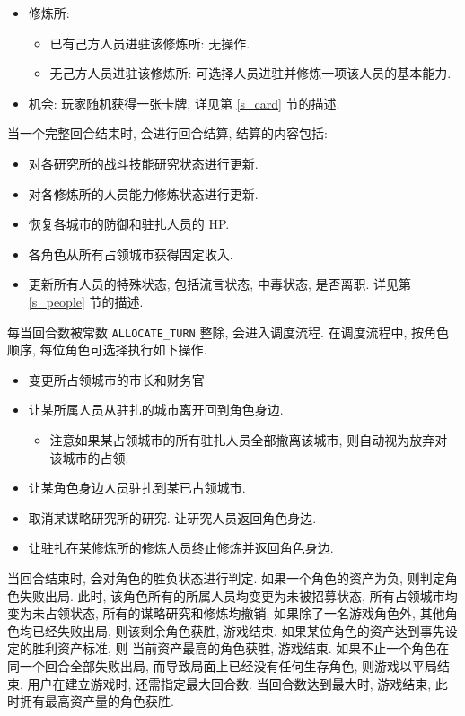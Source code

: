 \documentclass[UTF8, zihao=-4]{ctexart} %
\newcommand{\lcode}{\lstinline} % 段内插入代码
\begin{document}
\begin{itemize}
\begin{itemize}
\begin{itemize}
                \end{itemize}
            \item 修炼所:
                \begin{itemize}
                    \item 已有己方人员进驻该修炼所: 无操作.
                    \item 无己方人员进驻该修炼所: 可选择人员进驻并修炼一项该人员的基本能力.
                \end{itemize}
            \item 机会: 玩家随机获得一张卡牌, 详见第 \ref{s_card} 节的描述.
        \end{itemize}
\end{itemize}

当一个完整回合结束时, 会进行回合结算, 结算的内容包括:
\begin{itemize}
    \item 对各研究所的战斗技能研究状态进行更新.
    \item 对各修炼所的人员能力修炼状态进行更新.
    \item 恢复各城市的防御和驻扎人员的 HP.
    \item 各角色从所有占领城市获得固定收入.
    \item 更新所有人员的特殊状态, 包括流言状态, 中毒状态, 是否离职. 详见第 \ref{s_people} 节的描述.
\end{itemize}

每当回合数被常数 \lcode{ALLOCATE_TURN} 整除, 会进入调度流程. 在调度流程中, 按角色顺序, 每位角色可选择执行如下操作.
\begin{itemize}
    \item 变更所占领城市的市长和财务官
    \item 让某所属人员从驻扎的城市离开回到角色身边. 
        \begin{itemize}
            \item 注意如果某占领城市的所有驻扎人员全部撤离该城市, 则自动视为放弃对该城市的占领.
        \end{itemize}
    \item 让某角色身边人员驻扎到某已占领城市.
    \item 取消某谋略研究所的研究. 让研究人员返回角色身边.
    \item 让驻扎在某修炼所的修炼人员终止修炼并返回角色身边.
\end{itemize}

当回合结束时, 会对角色的胜负状态进行判定. 如果一个角色的资产为负, 则判定角色失败出局. 
此时, 该角色所有的所属人员均变更为未被招募状态, 所有占领城市均变为未占领状态,
所有的谋略研究和修炼均撤销. 如果除了一名游戏角色外, 其他角色均已经失败出局, 
则该剩余角色获胜, 游戏结束. 如果某位角色的资产达到事先设定的胜利资产标准, 则
当前资产最高的角色获胜, 游戏结束. 
如果不止一个角色在同一个回合全部失败出局, 而导致局面上已经没有任何生存角色, 则游戏以平局结束.
用户在建立游戏时, 还需指定最大回合数. 当回合数达到最大时, 游戏结束, 此时拥有最高资产量的角色获胜.
\end{document}
